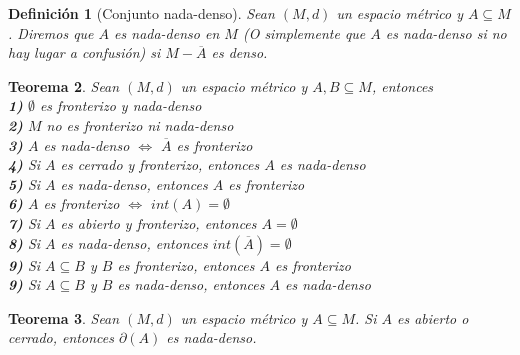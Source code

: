\documentclass[oneside]{book} %
\theoremstyle{Teorema}
\newtheorem{Definicion}{Definición}[chapter]
\newtheorem{Teorema}[Definicion]{Teorema}
\theoremstyle{Ejemplos}
\theoremstyle{[Obs]}
\renewcommand{\{}{\left\lbrace} %
\renewcommand{\}}{\right\rbrace} %
\renewcommand{\sc}{\subseteq} %
\begin{document}
			\begin{Definicion}[Conjunto nada-denso]
				
				Sean $(M, d)$ un espacio métrico y $A \sc M$. Diremos que $A$ es nada-denso en $M$ (O simplemente que $A$ es nada-denso si no hay lugar a confusión) si $M - \overline{A}$ es denso. \\

			\end{Definicion}

			\begin{Teorema}
				
				Sean $(M, d)$ un espacio métrico y $A, B \sc M$, entonces \\

				\textbf{1)} $\emptyset$ es fronterizo y nada-denso \\

				\textbf{2)} $M$ no es fronterizo ni nada-denso \\

				\textbf{3)} $A$ es nada-denso $\Leftrightarrow$ $\overline{A}$ es fronterizo \\

				\textbf{4)} Si $A$ es cerrado y fronterizo, entonces $A$ es nada-denso \\

				\textbf{5)} Si $A$ es nada-denso, entonces $A$ es fronterizo \\

				\textbf{6)} $A$ es fronterizo $\Leftrightarrow$ $int(A) = \emptyset$ \\

				\textbf{7)} Si $A$ es abierto y fronterizo, entonces $A = \emptyset$ \\

				\textbf{8)} Si $A$ es nada-denso, entonces $int(\overline{A}) = \emptyset$ \\

				\textbf{9)} Si $A \sc B$ y $B$ es fronterizo, entonces $A$ es fronterizo \\

				\textbf{9)} Si $A \sc B$ y $B$ es nada-denso, entonces $A$ es nada-denso \\

			\end{Teorema}

			\begin{Teorema}
				
				Sean $(M, d)$ un espacio métrico y $A \sc M$. Si $A$ es abierto o cerrado, entonces $\partial(A)$ es nada-denso. \\

			\end{Teorema}
\end{document}
